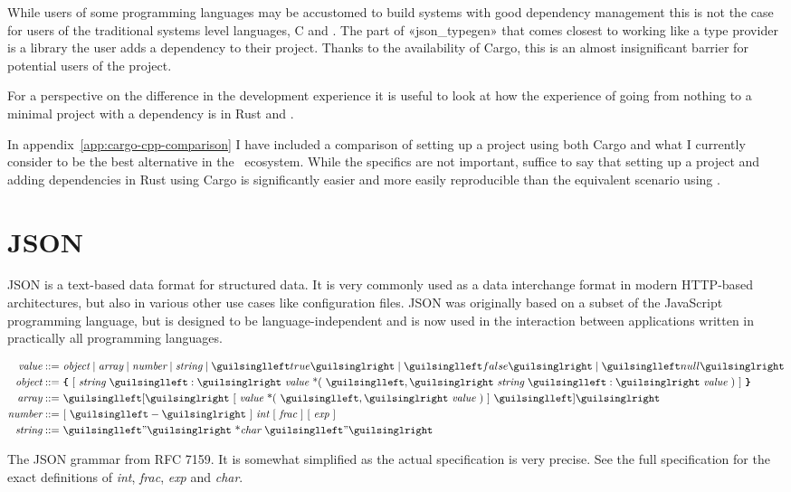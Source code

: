 While users of some programming languages may be accustomed to build systems with good dependency management this is not the case for users of the traditional systems level languages, C and \cpp. The part of «json_typegen» that comes closest to working like a type provider is a library the user adds a dependency to their project. Thanks to the availability of Cargo, this is an almost insignificant barrier for potential users of the project.

For a perspective on the difference in the development experience it is useful to look at how the experience of going from nothing to a minimal project with a dependency is in Rust and \cpp.

In appendix~\ref{app:cargo-cpp-comparison} I have included a comparison of setting up a project using both Cargo and what I currently consider to be the best alternative in the \cpp\ ecosystem. While the specifics are not important, suffice to say that setting up a project and adding dependencies in Rust using Cargo is significantly easier and more easily reproducible than the equivalent scenario using \cpp.


\section{JSON}
\label{sec:json}

JSON is a text-based data format for structured data. It is very commonly used as a data interchange format in modern HTTP-based architectures, but also in various other use cases like configuration files. JSON was originally based on a subset of the JavaScript programming language, but is designed to be language-independent and is now used in the interaction between applications written in practically all programming languages.

\begin{listing}[ht!]
\begin{align*}
\textit{value} ::=  &\ \textit{object} \mid \textit{array} \mid \textit{number} \mid \textit{string} \mid ‹true› \mid ‹false› \mid ‹null› \\
\textit{object} ::=  &\ \icode{\{}\ [\ \textit{string}\ ‹:›\ \textit{value}\ \text{*}(\ ‹,›\ \textit{string}\ ‹:›\ \textit{value}\ )\ ]\ \icode{\}} \\
\textit{array} ::= &\ ‹[›\ [\ \textit{value}\ \text{*}(\ ‹,›\ \textit{value}\ )\ ]\ ‹]› \\
\textit{number} ::= &\ [\ ‹-›\ ]\ \textit{int}\ [\ \textit{frac}\ ]\ [\ \textit{exp}\ ]\ \\
\textit{string} ::= &\ ‹"›\ \text{*}\textit{char}\ ‹"›
\end{align*}
\caption[The JSON grammar]{The JSON grammar from RFC 7159. It is somewhat simplified as the actual specification is very precise. See the full specification for the exact definitions of \textit{int}, \textit{frac}, \textit{exp} and \textit{char}.}
\label{lst:json-grammar}
\end{listing}

